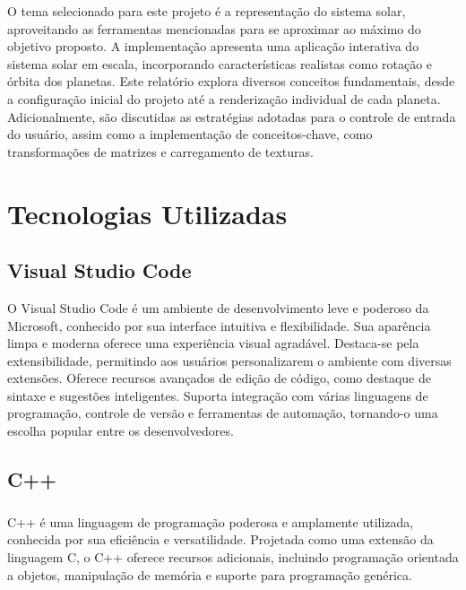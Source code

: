 \documentclass[12pt,a4paper]{memoir}
\begin{document}
O tema selecionado para este projeto é a representação do sistema solar, aproveitando as ferramentas mencionadas para se aproximar ao máximo do objetivo proposto. A implementação apresenta uma aplicação interativa do sistema solar em escala, incorporando características realistas como rotação e órbita dos planetas. Este relatório explora diversos conceitos fundamentais, desde a configuração inicial do projeto até a renderização individual de cada planeta. Adicionalmente, são discutidas as estratégias adotadas para o controle de entrada do usuário, assim como a implementação de conceitos-chave, como transformações de matrizes e carregamento de texturas.

\newpage





\chapter{Tecnologias Utilizadas}
\label{chap:Desenvolvimento}

\section{Visual Studio Code}
\label{chap2:sec:vscode}

O Visual Studio Code é um ambiente de desenvolvimento leve e poderoso da Microsoft, conhecido por sua interface intuitiva e flexibilidade. Sua aparência limpa e moderna oferece uma experiência visual agradável. Destaca-se pela extensibilidade, permitindo aos usuários personalizarem o ambiente com diversas extensões. Oferece recursos avançados de edição de código, como destaque de sintaxe e sugestões inteligentes. Suporta integração com várias linguagens de programação, controle de versão e ferramentas de automação, tornando-o uma escolha popular entre os desenvolvedores.



\section{C++}
\label{chap2:sec:c++}
\paragraph{}
C++ é uma linguagem de programação poderosa e amplamente utilizada, conhecida por sua eficiência e versatilidade. Projetada como uma extensão da linguagem C, o C++ oferece recursos adicionais, incluindo programação orientada a objetos, manipulação de memória e suporte para programação genérica.
\end{document}
